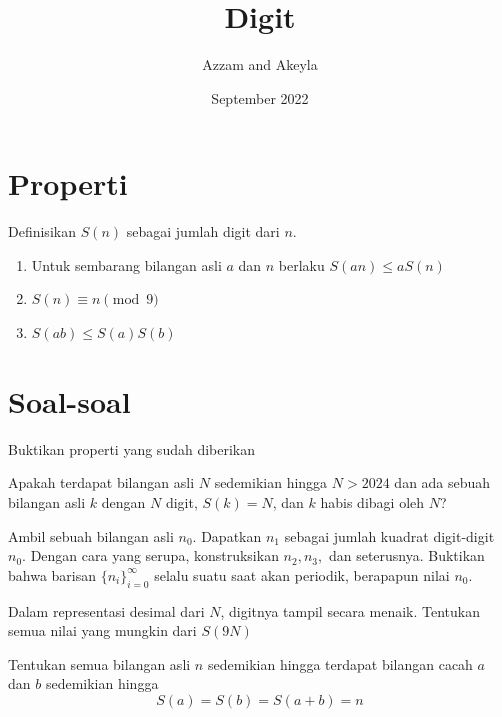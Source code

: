 \documentclass[11pt]{scrartcl}
\title{Digit}
\author{Azzam and Akeyla}
\date{September 2022}
\begin{document}
\maketitle

\renewcommand*\contentsname{Daftar Isi}
\tableofcontents

\newpage

\section{Properti}
Definisikan $S(n)$ sebagai jumlah digit dari $n$.
\begin{enumerate}
    \item Untuk sembarang bilangan asli $a$ dan $n$ berlaku $S(an) \leq aS(n)$
    \item $S(n) \equiv n \pmod{9}$
    \item $S(ab) \leq S(a)S(b)$
\end{enumerate}


\section{Soal-soal}
    \begin{problem}
    Buktikan properti yang sudah diberikan
    \end{problem}

    \begin{problem}
    Apakah terdapat bilangan asli $N$ sedemikian hingga $N > 2024$ dan ada sebuah bilangan asli $k$ dengan $N$ digit, $S(k) = N$, dan $k$ habis dibagi oleh $N$?
    \end{problem}

    \begin{problem}[IGMO 2022]
    Ambil sebuah bilangan asli $n_0$. Dapatkan $n_1$ sebagai jumlah kuadrat digit-digit $n_0$. Dengan cara yang serupa, konstruksikan $n_2, n_3, $ dan seterusnya. Buktikan bahwa barisan $\{n_i\}_{i = 0}^{\infty}$ selalu suatu saat akan periodik, berapapun nilai $n_0$.
    \end{problem}
    
    \begin{problem}[Rusia MO 1999]
    Dalam representasi desimal dari $N$, digitnya tampil secara menaik. Tentukan semua nilai yang mungkin dari $S(9N)$
    \end{problem}
    
    \begin{problem}
    Tentukan semua bilangan asli $n$ sedemikian hingga terdapat bilangan cacah $a$ dan $b$ sedemikian hingga \[S(a) = S(b) = S(a + b) = n\]
    \end{problem}
    
\end{document}
